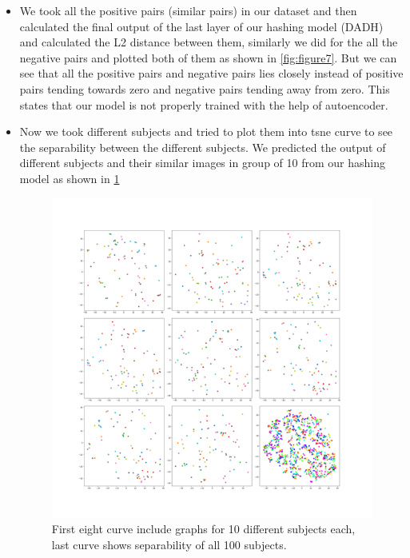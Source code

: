 \begin{itemize}
    \item We took all the positive pairs (similar pairs) in our dataset and then calculated the final output of the last layer of our hashing model (DADH) and calculated the L2 distance between them, similarly we did for the all the negative pairs and plotted both of them as shown in \ref{fig:figure7}. But we can see that all the positive pairs and negative pairs lies closely instead of positive pairs tending towards zero and negative pairs tending away from zero. This states that our model is not properly trained with the help of autoencoder.
    \item Now we took different subjects and tried to plot them into tsne \cite{Maaten2008VisualizingDU} curve to see the separability between the different subjects. We predicted the output of different subjects and their similar images in group of 10 from our hashing model as shown in \ref{fig:figure8}
\begin{figure}[htbp]
\centering
\includegraphics[scale=0.3]{./Chapter4/Figures/AEtsne_1}
\caption{First eight curve include graphs for 10 different subjects each, last curve shows separability of all 100 subjects.}
\label{fig:figure8}
\end{figure}
    \end{itemize}

